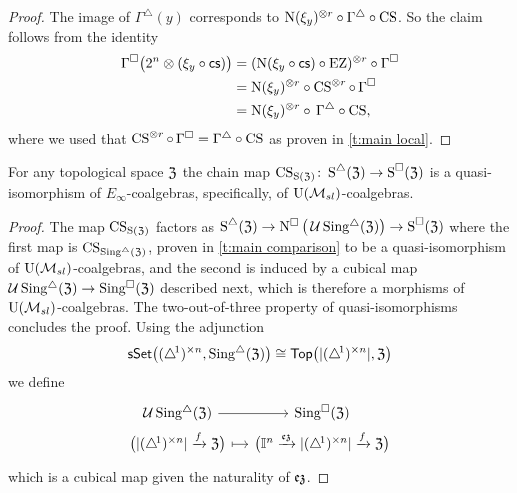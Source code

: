 \begin{proof}
	The image of $\Gamma^\triangle(y)$ corresponds to $\operatorname{N}(\xi_y)^{\otimes r} \circ \Gamma^\triangle \circ \operatorname{CS}$.
	So the claim follows from the identity
	\begin{align*}
		\Gamma^\square \big( 2^n \otimes (\xi_y \circ \operatorname{\mathsf{cs}}) \big) &=
		(\operatorname{N}(\xi_y \circ \operatorname{\mathsf{cs}}) \circ \operatorname{EZ})^{\otimes r} \circ \Gamma^\square  \\ &=
		\operatorname{N}(\xi_y)^{\otimes r} \circ \operatorname{CS}^{\otimes r} \circ \, \Gamma^\square  \\ &=
		\operatorname{N}(\xi_y)^{\otimes r} \circ \, \Gamma^\triangle \circ \operatorname{CS},
	\end{align*}
	where we used that $\operatorname{CS}^{\otimes r} \circ \, \Gamma^\square = \Gamma^\triangle \circ \operatorname{CS}$ as proven in \cref{t:main local}.
\end{proof}


\begin{corollary}
	For any topological space $\mathfrak{Z}$ the chain map $\operatorname{CS}_{\operatorname{S}(\mathfrak{Z})} \colon \operatorname{\operatorname{S}^{\triangle}}(\mathfrak{Z}) \to \operatorname{\operatorname{S}^{\square}}(\mathfrak{Z})$ is a quasi-isomorphism of $E_\infty$-coalgebras, specifically, of ${\operatorname{U}(\mathcal{M}_{sl})}$-coalgebras.
\end{corollary}

\begin{proof}
	The map $\operatorname{CS}_{\operatorname{S}(\mathfrak{Z})}$ factors as $\operatorname{\operatorname{S}^{\triangle}}(\mathfrak{Z}) \to \operatorname{N^{\square}} \big( \operatorname{\mathcal{U}} \operatorname{Sing^{\triangle}}(\mathfrak{Z}) \big) \to \operatorname{\operatorname{S}^{\square}}(\mathfrak{Z})$ where the first map is $\operatorname{CS}_{\operatorname{Sing^{\triangle}}(\mathfrak{Z})}$, proven in \cref{t:main comparison} to be a quasi-isomorphism of ${\operatorname{U}(\mathcal{M}_{sl})}$-coalgebras, and the second is induced by a cubical map $\operatorname{\mathcal{U}} \operatorname{Sing^{\triangle}}(\mathfrak{Z}) \to \operatorname{Sing^{\square}}(\mathfrak{Z})$ described next, which is therefore a morphisms of ${\operatorname{U}(\mathcal{M}_{sl})}$-coalgebras.
	The two-out-of-three property of quasi-isomorphisms concludes the proof.
	Using the adjunction
	\[
	\mathsf{sSet} \big( (\triangle^{\!1})^{\times n}, \operatorname{Sing^{\triangle}}(\mathfrak{Z}) \big) \cong \mathsf{Top} \big( \lvert(\triangle^{\!1})^{\times n}\rvert, \mathfrak{Z} \big)
	\]
	we define
	\[
	\begin{tikzcd} [row sep=0, column sep=small]
		\cubify \sSing(\fZ) \arrow[r] &
		\cSing(\fZ) \\
		\big( \bars{\scube{n} } \xra{f} \fZ \big) \arrow[r, mapsto] &
		\big( \gcube^n \xra{\ez} \bars{\scube{n}} \xra{f} \fZ \big)
	\end{tikzcd}
	\]
	which is a cubical map given the naturality of $\operatorname{\mathfrak{ez}}$.
\end{proof}


